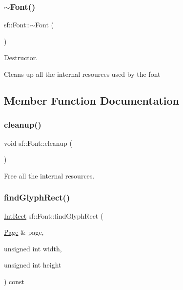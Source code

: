 \subsubsection{\texorpdfstring{$\sim$Font()}{~Font()}}
{\footnotesize\ttfamily sf\+::\+Font\+::$\sim$\+Font (\begin{DoxyParamCaption}{ }\end{DoxyParamCaption})}



Destructor. 

Cleans up all the internal resources used by the font \begin{DoxyVerb}\end{DoxyVerb}
 

\subsection{Member Function Documentation}
\mbox{\label{classsf_1_1_font_aa730fde783fa25a369941a12ae9d1e8e}} 
\subsubsection{\texorpdfstring{cleanup()}{cleanup()}}
{\footnotesize\ttfamily void sf\+::\+Font\+::cleanup (\begin{DoxyParamCaption}{ }\end{DoxyParamCaption})\hspace{0.3cm}{\ttfamily [private]}}



Free all the internal resources. 

\begin{DoxyVerb}\end{DoxyVerb}
 \mbox{\label{classsf_1_1_font_a9201f9699d7c2c22975fa405465aa933}} 
\subsubsection{\texorpdfstring{findGlyphRect()}{findGlyphRect()}}
{\footnotesize\ttfamily \mbox{\hyperlink{classsf_1_1_rect}{Int\+Rect}} sf\+::\+Font\+::find\+Glyph\+Rect (\begin{DoxyParamCaption}\item[{\mbox{\hyperlink{structsf_1_1_font_1_1_page}{Page}} \&}]{page,  }\item[{unsigned int}]{width,  }\item[{unsigned int}]{height }\end{DoxyParamCaption}) const\hspace{0.3cm}{\ttfamily [private]}}



